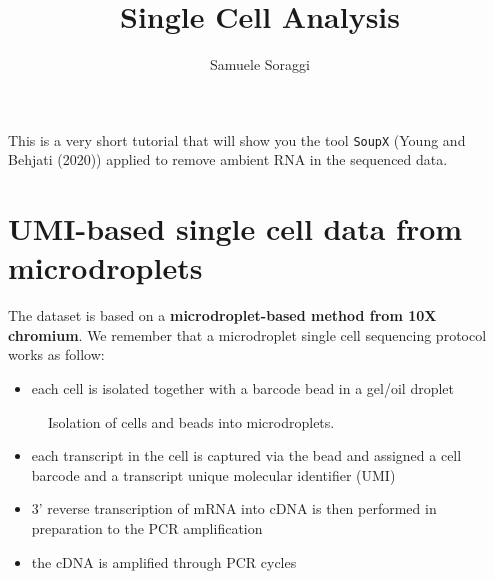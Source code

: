 \documentclass[
  letterpaper,
  DIV=11,
  numbers=noendperiod]{scrartcl}
\title{Single Cell Analysis}
\author{Samuele Soraggi}
\date{}
\providecommand{\tightlist}{%
  \setlength{\itemsep}{0pt}\setlength{\parskip}{0pt}}\usepackage{longtable,booktabs,array}
\renewcommand*\contentsname{Table of contents}
\newcommand\contentsname{Table of contents}
\begin{document}
\maketitle

\renewcommand*\contentsname{Table of contents}
{
\hypersetup{linkcolor=}
\setcounter{tocdepth}{3}
\tableofcontents
}
This is a very short tutorial that will show you the tool \texttt{SoupX}
(Young and Behjati (2020)) applied to remove ambient RNA in the
sequenced data.

\section{UMI-based single cell data from
microdroplets}\label{umi-based-single-cell-data-from-microdroplets}

The dataset is based on a \textbf{microdroplet-based method from 10X
chromium}. We remember that a microdroplet single cell sequencing
protocol works as follow:

\begin{itemize}
\tightlist
\item
  each cell is isolated together with a barcode bead in a gel/oil
  droplet
\end{itemize}

\begin{figure}


\caption{\label{fig-beads}Isolation of cells and beads into
microdroplets.}

\end{figure}%

\begin{itemize}
\tightlist
\item
  each transcript in the cell is captured via the bead and assigned a
  cell barcode and a transcript unique molecular identifier (UMI)
\item
  3' reverse transcription of mRNA into cDNA is then performed in
  preparation to the PCR amplification
\item
  the cDNA is amplified through PCR cycles
\end{itemize}
\end{document}
